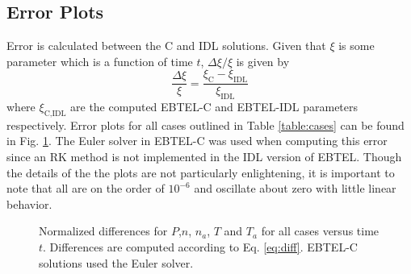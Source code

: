\documentclass[preprint,10pt]{aastex}
\newcommand{\figex}{/Users/willbarnes/Documents/Rice/Research/EBTEL_figures/}
\begin{document}
\begin{appendix}
\section{Error Plots}
Error is calculated between the C and IDL solutions. Given that $\xi$ is some parameter which is a function of time $t$, $\Delta\xi/\xi$ is given by
\begin{equation}
\frac{\Delta\xi}{\xi}=\frac{\xi_{\text{C}} - \xi_{\text{IDL}}}{\xi_{\text{IDL}}}
\label{eq:diff}
\end{equation}
where $\xi_{\text{C,IDL}}$ are the computed EBTEL-C and EBTEL-IDL parameters respectively. Error plots for all cases outlined in Table \ref{table:cases} can be found in Fig. \ref{fig:fdiff}. The Euler solver in EBTEL-C was used when computing this error since an RK method is not implemented in the IDL version of EBTEL. Though the details of the the plots are not particularly enlightening, it is important to note that all are on the order of $10^{-6}$ and oscillate about zero with little linear behavior. 
%
\begin{figure}
\centering
{}
\caption{Normalized differences for $P$,$n$, $n_a$, $T$ and $T_a$ for all cases versus time $t$. Differences are computed according to Eq. \ref{eq:diff}. EBTEL-C solutions used the Euler solver.}
\label{fig:fdiff}
\end{figure}
%

\end{appendix}
\end{document}
